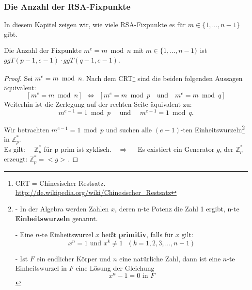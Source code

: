 \begin{refsegment}
\subsubsection{Die Anzahl der RSA-Fixpunkte}
In diesem Kapitel zeigen wir, wie viele RSA-Fixpunkte es für $m \in \{1,...,n-1\} $ gibt.\\

\begin{satz}\label{nt-number-of-fixpoints-1-to-n-1}
  Die Anzahl der Fixpunkte $ m^e = m \bmod n$ mit
  $m \in \{1,...,n-1\} $ ist \\$ ggT(p-1, e-1) \cdot ggT(q-1, e-1) $.
\end{satz}

\begin{proof}{}%
Sei $m^e = m \bmod n.$
Nach dem CRT\footnote{%
  CRT = Chinesischer Restsatz.
  \url{http://de.wikipedia.org/wiki/Chinesischer_Restsatz}
}
sind die beiden folgenden Aussagen äquivalent:\\
$$ [ m^e = m \bmod n ]~~ \Leftrightarrow ~~[ m^{e} = m \bmod p \text{ ~~und~~  } m^{e} = m \bmod q ] $$
Weiterhin ist die Zerlegung auf der rechten Seite äquivalent zu:
$$m^{e-1} = 1 \bmod p \text{ ~~~und~~~ } m^{e-1} = 1 \bmod q. $$


\noindent Wir betrachten  $m^{e-1} = 1 \bmod p $ und  suchen alle $(e-1)$-ten
Einheitswurzeln\footnote{%
- In der Algebra werden Zahlen $x$, deren n-te Potenz die Zahl 1 ergibt, n-te \textbf{Einheitswurzeln} genannt.

\noindent- Eine $n$-te Einheitswurzel $x$ heißt \textbf{primitiv}, falls für $x$ gilt:
 $$x^{n} = 1  \text{ und }   x^{k} \neq 1 ~~~(k = 1,2, 3, ..., n-1)$$


\noindent- Ist $F$ ein endlicher Körper und $n$ eine natürliche Zahl, dann ist eine
$n$-te Einheitswurzel in $F$ eine Lösung der Gleichung $$ x^{n}-1 = 0 \text{ in } F $$
}
in $\mathbb{Z}_p^{*}.$\\
Es gilt:~~ $\mathbb{Z}_p^{*}$ für p prim ist zyklisch.~~$\Rightarrow $~~
Es existiert ein Generator $g$, der $\mathbb{Z}_p^{*}$ erzeugt: $\mathbb{Z}_p^{*}=<g>$.


\end{proof}
\end{refsegment}
